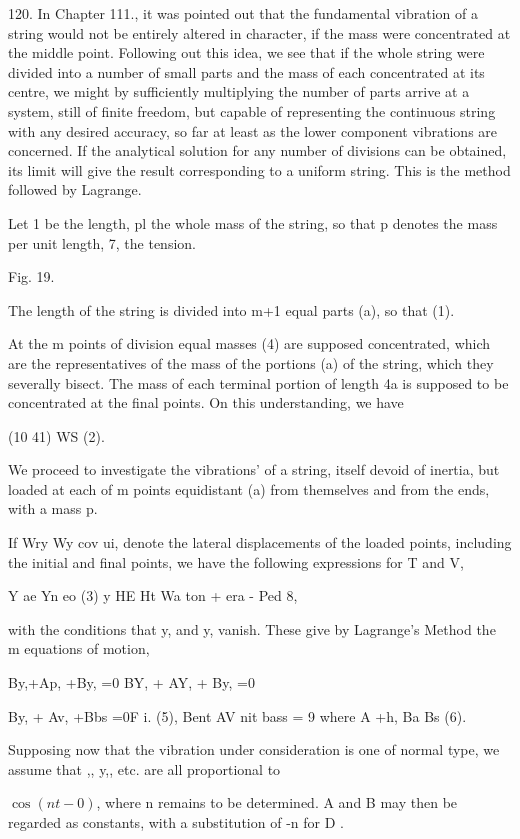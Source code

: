 120. In Chapter 111., it was pointed out that the fundamental vibration of a
string would not be entirely altered in character, if the mass were
concentrated at the middle point. Following out this idea, we see that if the
whole string were divided into a number of small parts and the mass of each
concentrated at its centre, we might by sufficiently multiplying the number of
parts arrive at a system, still of finite freedom, but capable of representing
the continuous string with any desired accuracy, so far at least as the lower
component vibrations are concerned. If the analytical solution for any number
of divisions can be obtained, its limit will give the result corresponding to a
uniform string. This is the method followed by Lagrange.

Let 1 be the length, pl the whole mass of the string, so that p denotes the
mass per unit length, 7, the tension.

Fig. 19.

The length of the string is divided into m+1 equal parts (a), so that (1).

At the m points of division equal masses (4) are supposed concentrated, which
are the representatives of the mass of the portions (a) of the string, which
they severally bisect. The mass of each terminal portion of length 4a is
supposed to be concentrated at the final points. On this understanding, we have

(10 41) WS (2).

We proceed to investigate the vibrations' of a string, itself devoid of
inertia, but loaded at each of m points equidistant (a) from themselves and
from the ends, with a mass p.

If Wry Wy cov ui, denote the lateral displacements of the loaded points,
including the initial and final points, we have the following expressions for T
and V,

Y ae Yn eo (3) y HE Ht Wa ton + era - Ped 8,

with the conditions that y, and y, vanish. These give by Lagrange's Method the
m equations of motion,

By,+Ap, +By, =0 BY, + AY, + By, =0

By, + Av, +Bbs =0F i. (5), Bent AV nit bass = 9 where A +h, Ba Bs (6).

Supposing now that the vibration under consideration is one of normal type, we
assume that ,, y,, etc. are all proportional to

\(\cos(nt -0)\), where n remains to be determined. A and B may then be regarded
as constants, with a substitution of -n for D .

